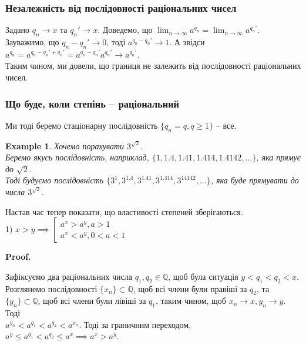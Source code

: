 \documentclass[a4paper, 14pt]{article}
\makeatletter
\def\qed{$\blacksquare$}
\theoremstyle{theoremdd}
\theoremstyle{theoremdd}
\theoremstyle{theoremdd}
\theoremstyle{theoremdd}
\newtheorem{example}[theorem]{Example}
\theoremstyle{theoremdd}
\theoremstyle{theoremdd}
\theoremstyle{theoremdd}
\theoremstyle{theoremdd}
\renewenvironment{proof}[1][Proof.\\]{\par
\pushQED{\hfill \qed}%
\normalfont \topsep6\p@\@plus6\p@\relax
\trivlist
\item\relax
{\bfseries
#1\@addpunct{.}}\hspace\labelsep\ignorespaces
}{%
\popQED\endtrivlist\@endpefalse
}
\makeatother
\begin{document}
\subsubsection*{Незалежність від послідовності раціональних чисел}
Задано $q_n \to x$ та $q_n' \to x$. Доведемо, що $\displaystyle\lim_{n \to \infty} a^{q_n} = \displaystyle\lim_{n \to \infty} a^{q_n'}$.\\

Зауважимо, що $q_n - q_n' \to 0$, тоді $a^{q_n - q_n'} \to 1$. А звідси $a^{q_n} = a^{q_n - q_n' + q_n'} = a^{q_n - q_n'} a^{q_n'} \to a^{q_n'}$.\\
Таким чином, ми довели, що границя не залежить від послідовності раціональних чисел.

\subsubsection*{Що буде, коли степінь -- раціональний}
Ми тоді беремо стаціонарну послідовність $\{q_n = q, q \geq 1\}$ -- все.

\begin{example}
Хочемо порахувати $3^{\sqrt{2}}$. \\ Беремо якусь послідовність, наприклад, $\{1,1.4,1.41,1.414,1.4142,\dots\}$, яка прямує до $\sqrt{2}$.\\
Тоді будуємо послідовність $\{3^1,3^{1.4},3^{1.41},3^{1.414},3^{14142},\dots\}$, яка буде прямувати до числа $3^{\sqrt{2}}$.
\\
\end{example}

Настав час тепер показати, що властивості степеней зберігаються.\\
1) $x > y \implies \left[ \begin{gathered} a^{x} > a^{y}, a>1 \\ a^{x} < a^{y}, 0<a<1 \end{gathered} \right.$
\begin{proof}
Зафіксуємо два раціональних числа $q_1,q_2 \in \mathbb{Q}$, щоб була ситуація $y < q_1 < q_2 < x$.\\
Розглянемо послідовності $\{x_n\} \subset \mathbb{Q}$, щоб всі члени були правіші за $q_2$, та $\{y_n\} \subset \mathbb{Q}$, щоб всі члени були лівіші за $q_1$, таким чином, щоб $x_n \to x, y_n \to y$. Тоді\\
$a^{y_n} < a^{q_1} < a^{q_2} < a^{x_n}$. Тоді за граничним переходом, $a^y \leq a^{q_1} < a^{q_2} \leq a^x \implies a^x > a^y$.
\end{proof}
\end{document}
